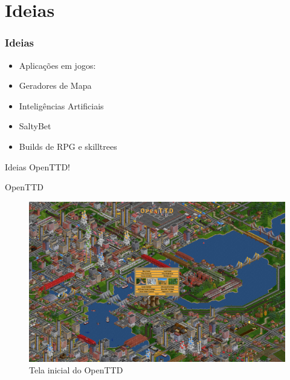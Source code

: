 \documentclass[10pt]{beamer}
\begin{document}
%		

\section{Ideias}

\begin{frame}[fragile]
  \frametitle{Ideias}
	  \begin{itemize}
	  	\item Aplicações em jogos:
	  	\item Geradores de Mapa
	  	\item Inteligências Artificiais
	  	\item SaltyBet
	  	\item Builds de RPG e skilltrees
	  \end{itemize}
\end{frame}

\begin{frame}{Ideias}
	OpenTTD!
\end{frame}

\begin{frame}{OpenTTD}
	\begin{figure}
	\centering
	\includegraphics[width=1\linewidth]{OpenTTD}
	\caption{Tela inicial do OpenTTD}
	\label{fig:OpenTTD}
	\end{figure}
\end{frame}
\end{document}
